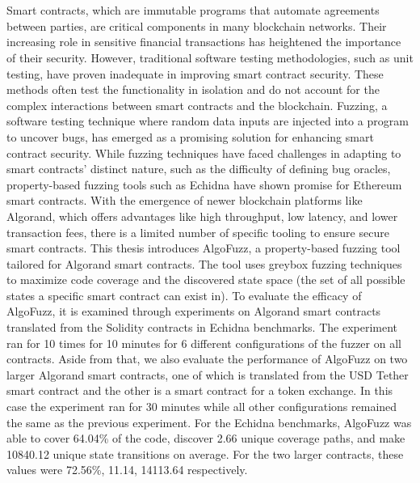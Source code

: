 \chapter{\abstractname}
Smart contracts, which are immutable programs that automate agreements between parties, are critical components in many blockchain networks. Their increasing role in sensitive financial transactions has heightened the importance of their security.
However, traditional software testing methodologies, such as unit testing, have proven inadequate in improving smart contract security.
These methods often test the functionality in isolation and do not account for the complex interactions between smart contracts and the blockchain.
Fuzzing, a software testing technique where random data inputs are injected into a program to uncover bugs, has emerged as a promising solution for enhancing smart contract security.
While fuzzing techniques have faced challenges in adapting to smart contracts' distinct nature, such as the difficulty of defining bug oracles, property-based fuzzing tools such as Echidna have shown promise for Ethereum smart contracts.
With the emergence of newer blockchain platforms like Algorand, which offers advantages like high throughput, low latency, and lower transaction fees, there is a limited number of specific tooling to ensure secure smart contracts.
This thesis introduces AlgoFuzz, a property-based fuzzing tool tailored for Algorand smart contracts.
The tool uses greybox fuzzing techniques to maximize code coverage and the discovered state space (the set of all possible states a specific smart contract can exist in).
To evaluate the efficacy of AlgoFuzz, it is examined through experiments on Algorand smart contracts translated  from the Solidity contracts in Echidna benchmarks. The experiment ran for 10 times for 10 minutes for 6 different configurations of the fuzzer on all contracts.
Aside from that, we also evaluate the performance of AlgoFuzz on two larger Algorand smart contracts, one of which is translated from the USD Tether smart contract and the other is a smart contract for a token exchange.
In this case the experiment ran for 30 minutes while all other configurations remained the same as the previous experiment.
For the Echidna benchmarks, AlgoFuzz was able to cover 64.04\% of the code, discover 2.66 unique coverage paths, and make 10840.12 unique state transitions on average. For the two larger contracts, these values were 72.56\%, 11.14, 14113.64 respectively.


